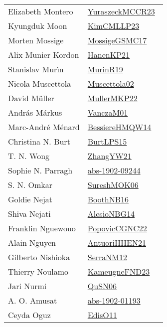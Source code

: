 {\begin{longtable}{p{4cm}p{20cm}}
Elizabeth Montero & \href{works/YuraszeckMCCR23.pdf}{YuraszeckMCCR23}~\cite{YuraszeckMCCR23}\\
Kyungduk Moon & \href{works/KimCMLLP23.pdf}{KimCMLLP23}~\cite{KimCMLLP23}\\
Morten Mossige & \href{works/MossigeGSMC17.pdf}{MossigeGSMC17}~\cite{MossigeGSMC17}\\
Alix Munier Kordon & \href{works/HanenKP21.pdf}{HanenKP21}~\cite{HanenKP21}\\
Stanislav Mur{\'{\i}}n & \href{works/MurinR19.pdf}{MurinR19}~\cite{MurinR19}\\
Nicola Muscettola & \href{works/Muscettola02.pdf}{Muscettola02}~\cite{Muscettola02}\\
David M{\"{u}}ller & \href{works/MullerMKP22.pdf}{MullerMKP22}~\cite{MullerMKP22}\\
Andr{\'{a}}s M{\'{a}}rkus & \href{works/VanczaM01.pdf}{VanczaM01}~\cite{VanczaM01}\\
Marc{-}Andr{\'{e}} M{\'{e}}nard & \href{works/BessiereHMQW14.pdf}{BessiereHMQW14}~\cite{BessiereHMQW14}\\
Christina N. Burt & \href{works/BurtLPS15.pdf}{BurtLPS15}~\cite{BurtLPS15}\\
T. N. Wong & \href{works/ZhangYW21.pdf}{ZhangYW21}~\cite{ZhangYW21}\\
Sophie N. Parragh & \href{works/abs-1902-09244.pdf}{abs-1902-09244}~\cite{abs-1902-09244}\\
S. N. Omkar & \href{works/SureshMOK06.pdf}{SureshMOK06}~\cite{SureshMOK06}\\
Goldie Nejat & \href{works/BoothNB16.pdf}{BoothNB16}~\cite{BoothNB16}\\
Shiva Nejati & \href{works/AlesioNBG14.pdf}{AlesioNBG14}~\cite{AlesioNBG14}\\
Franklin Nguewouo & \href{works/PopovicCGNC22.pdf}{PopovicCGNC22}~\cite{PopovicCGNC22}\\
Alain Nguyen & \href{works/AntuoriHHEN21.pdf}{AntuoriHHEN21}~\cite{AntuoriHHEN21}\\
Gilberto Nishioka & \href{works/SerraNM12.pdf}{SerraNM12}~\cite{SerraNM12}\\
Thierry Noulamo & \href{works/KameugneFND23.pdf}{KameugneFND23}~\cite{KameugneFND23}\\
Jari Nurmi & \href{works/QuSN06.pdf}{QuSN06}~\cite{QuSN06}\\
A. O. Amusat & \href{works/abs-1902-01193.pdf}{abs-1902-01193}~\cite{abs-1902-01193}\\
Ceyda Oguz & \href{works/EdisO11.pdf}{EdisO11}~\cite{EdisO11}\\

\end{longtable}}
